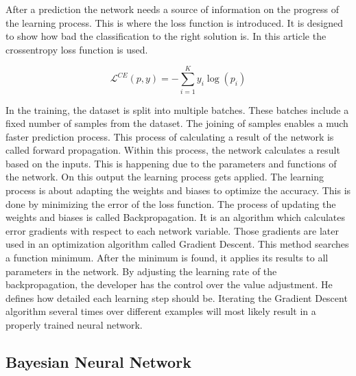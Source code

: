After a prediction the network needs a source of information on the progress of the learning process.
This is where the loss function is introduced.
It is designed to show how bad the classification to the right solution is.
In this article the crossentropy loss function is used.
\cite{math_nn_skalski, medium_nn_from_scratch}

\begin{equation}
    \mathcal{L}^{CE}(p,y) = -\sum_{i=1}^K y_i \log(p_i)
\end{equation}

In the training, the dataset is split into multiple batches.
These batches include a fixed number of samples from the dataset.
The joining of samples enables a much faster prediction process.
This process of calculating a result of the network is called forward propagation.
Within this process, the network calculates a result based on the inputs.
This is happening due to the parameters and functions of the network.
On this output the learning process gets applied.
\cite{math_nn_skalski, medium_nn_from_scratch}
\newline
The learning process is about adapting the weights and biases to optimize the accuracy.
This is done by minimizing the error of the loss function.
The process of updating the weights and biases is called Backpropagation.
It is an algorithm which calculates error gradients with respect to each network variable.
Those gradients are later used in an optimization algorithm called Gradient Descent.
This method searches a function minimum.
After the minimum is found, it applies its results to all parameters in the network.
By adjusting the learning rate of the backpropagation, the developer has the control over the value adjustment.
He defines how detailed each learning step should be.
\cite{math_nn_andrey}
\newline
Iterating the Gradient Descent algorithm several times over different examples will most likely result in a properly trained neural network.

\subsection*{Bayesian Neural Network}
\label{foundation_bayesian_nn}

